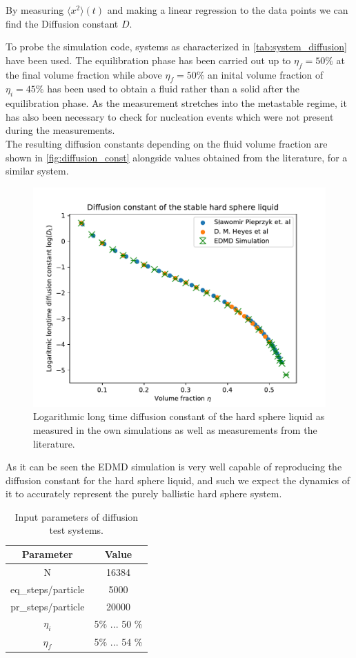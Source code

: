 By measuring $\langle x^2 \rangle (t)$ and making a linear regression to the data points we can find the Diffusion constant $D$.

To probe the simulation code, systems as characterized in \autoref{tab:system_diffusion} have been used. The equilibration phase has been carried out up to $\eta_f = 50\%$ at the final volume fraction while above $\eta_f =  50\% $ an inital volume fraction of $\eta_i = 45\%$ has been used to obtain a fluid rather than a solid after the equilibration phase. As the measurement stretches into the metastable regime, it has also been necessary to check for nucleation events which were not present during the measurements.\\

The resulting diffusion constants depending on the fluid volume fraction are shown in \autoref{fig:diffusion_const} alongside values obtained from the literature, for a similar system.\\

\begin{figure}[h]
\centering
\includegraphics[width=0.7 \linewidth]{../plots/diffusion_probe.pdf}
\caption{Logarithmic long time diffusion constant of the hard sphere liquid as measured in the own simulations as well as measurements from the literature. }
\label{fig:diffusion_const}
\end{figure}

As it can be seen the EDMD simulation is very well capable of reproducing the diffusion constant for the hard sphere liquid, and such we expect the dynamics of it to accurately represent the purely ballistic hard sphere system.\\


\begin{table}[h]
\centering
\begin{tabular}{c|c}
Parameter & Value \\ \hline
N & 16384 \\
eq\_steps/particle & 5000 \\
pr\_steps/particle & 20000 \\
$\eta_i$ & 5\% ... 50 \% \\
$\eta_f$ & 5\% ... 54 \% \\
\end{tabular}
\caption{Input parameters of diffusion test systems.}
\label{tab:system_diffusion}
\end{table}





